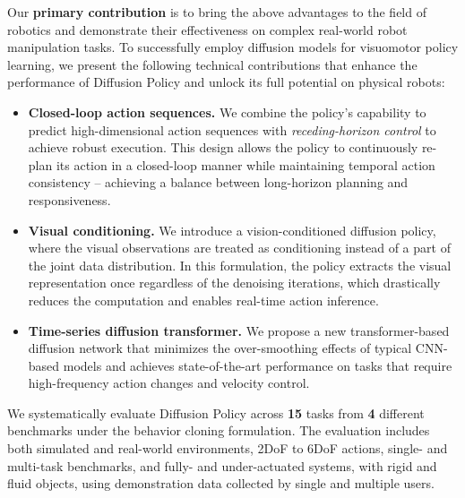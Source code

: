 Our \textbf{primary contribution} is to bring the above advantages to the field of robotics and demonstrate their effectiveness on complex real-world robot manipulation tasks. To successfully employ diffusion models for visuomotor policy learning, we present the following technical contributions that enhance the performance of Diffusion Policy and unlock its full potential on physical robots:
\begin{itemize} %
    \item \textbf{Closed-loop action sequences.} We combine the policy's capability to predict high-dimensional action sequences with \textit{receding-horizon control} to achieve robust execution. This design allows the policy to continuously re-plan its action in a closed-loop manner while maintaining temporal action consistency -- achieving a balance between long-horizon planning and responsiveness. 


    \item \textbf{Visual conditioning.} We introduce a vision-conditioned diffusion policy, where the visual observations are treated as conditioning instead of a part of the joint data distribution.  In this formulation, the policy extracts the visual representation once regardless of the denoising iterations, which drastically reduces the computation and enables real-time action inference. 


    \item \textbf{Time-series diffusion transformer.} We propose a new transformer-based diffusion network  that minimizes the over-smoothing effects of typical CNN-based models and achieves state-of-the-art performance on tasks that require high-frequency action changes and velocity control. 
\end{itemize}

We systematically evaluate Diffusion Policy across \textbf{15} tasks from \textbf{4} different benchmarks \cite{ibc, gupta2019relay, robomimic, bet} under the behavior cloning formulation. The evaluation includes both simulated and real-world environments, 2DoF to 6DoF actions, single- and multi-task benchmarks, and fully- and under-actuated systems, with rigid and fluid objects, using demonstration data collected by single and multiple users.  

